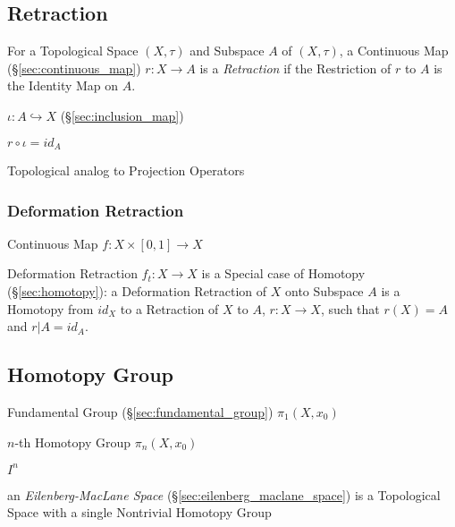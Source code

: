 


\subsection{Retraction}\label{sec:subspace_retraction}

For a Topological Space $(X, \tau)$ and Subspace $A$ of $(X,\tau)$, a
Continuous Map (\S\ref{sec:continuous_map}) $r : X \rightarrow A$ is a
\emph{Retraction} if the Restriction of $r$ to $A$ is the Identity Map
on $A$.

$\iota : A \hookrightarrow X$ (\S\ref{sec:inclusion_map})

$r \circ \iota = id_A$

Topological analog to Projection Operators %
\cite{hatcher02}



\subsubsection{Deformation Retraction}\label{sec:deformation_retraction}

Continuous Map $f : X \times [0,1] \rightarrow X$

Deformation Retraction $f_t : X \rightarrow X$ is a Special case of
Homotopy (\S\ref{sec:homotopy}): a Deformation Retraction of $X$ onto
Subspace $A$ is a Homotopy from $id_X$ to a Retraction of $X$ to $A$,
$r : X \rightarrow X$, such that $r(X) = A$ and $r | A = id_A$.
\cite{hatcher02}



\subsection{Homotopy Group}\label{sec:homotopy_group}

Fundamental Group (\S\ref{sec:fundamental_group}) $\pi_1(X,x_0)$

$n$-th Homotopy Group $\pi_n(X,x_0)$

$I^n$

an \emph{Eilenberg-MacLane Space} (\S\ref{sec:eilenberg_maclane_space}) is a
Topological Space with a single Nontrivial Homotopy Group



